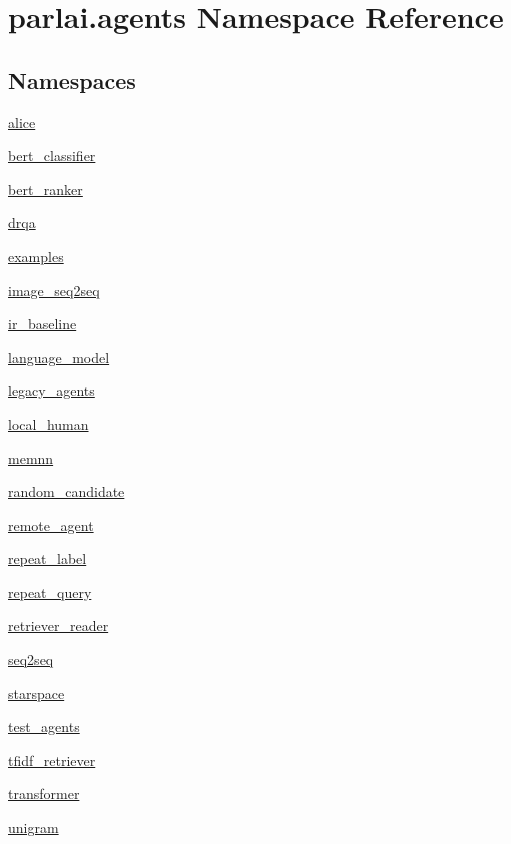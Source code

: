 \hypertarget{namespaceparlai_1_1agents}{}\section{parlai.\+agents Namespace Reference}
\label{namespaceparlai_1_1agents}
\subsection*{Namespaces}
\begin{DoxyCompactItemize}
\item 
 \hyperlink{namespaceparlai_1_1agents_1_1alice}{alice}
\item 
 \hyperlink{namespaceparlai_1_1agents_1_1bert__classifier}{bert\+\_\+classifier}
\item 
 \hyperlink{namespaceparlai_1_1agents_1_1bert__ranker}{bert\+\_\+ranker}
\item 
 \hyperlink{namespaceparlai_1_1agents_1_1drqa}{drqa}
\item 
 \hyperlink{namespaceparlai_1_1agents_1_1examples}{examples}
\item 
 \hyperlink{namespaceparlai_1_1agents_1_1image__seq2seq}{image\+\_\+seq2seq}
\item 
 \hyperlink{namespaceparlai_1_1agents_1_1ir__baseline}{ir\+\_\+baseline}
\item 
 \hyperlink{namespaceparlai_1_1agents_1_1language__model}{language\+\_\+model}
\item 
 \hyperlink{namespaceparlai_1_1agents_1_1legacy__agents}{legacy\+\_\+agents}
\item 
 \hyperlink{namespaceparlai_1_1agents_1_1local__human}{local\+\_\+human}
\item 
 \hyperlink{namespaceparlai_1_1agents_1_1memnn}{memnn}
\item 
 \hyperlink{namespaceparlai_1_1agents_1_1random__candidate}{random\+\_\+candidate}
\item 
 \hyperlink{namespaceparlai_1_1agents_1_1remote__agent}{remote\+\_\+agent}
\item 
 \hyperlink{namespaceparlai_1_1agents_1_1repeat__label}{repeat\+\_\+label}
\item 
 \hyperlink{namespaceparlai_1_1agents_1_1repeat__query}{repeat\+\_\+query}
\item 
 \hyperlink{namespaceparlai_1_1agents_1_1retriever__reader}{retriever\+\_\+reader}
\item 
 \hyperlink{namespaceparlai_1_1agents_1_1seq2seq}{seq2seq}
\item 
 \hyperlink{namespaceparlai_1_1agents_1_1starspace}{starspace}
\item 
 \hyperlink{namespaceparlai_1_1agents_1_1test__agents}{test\+\_\+agents}
\item 
 \hyperlink{namespaceparlai_1_1agents_1_1tfidf__retriever}{tfidf\+\_\+retriever}
\item 
 \hyperlink{namespaceparlai_1_1agents_1_1transformer}{transformer}
\item 
 \hyperlink{namespaceparlai_1_1agents_1_1unigram}{unigram}
\end{DoxyCompactItemize}
